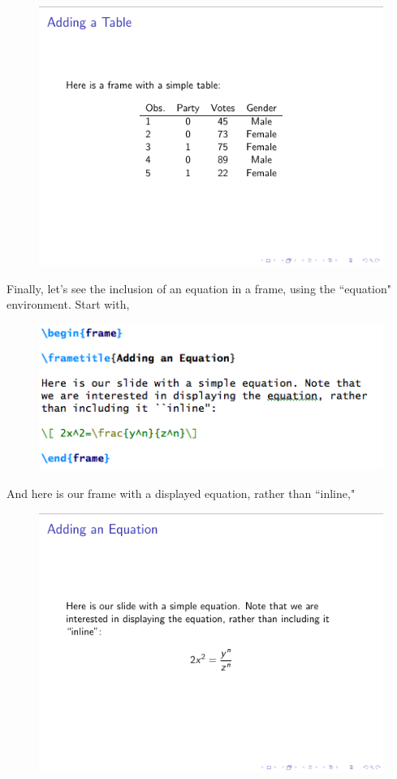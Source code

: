 \documentclass[11pt]{article}
\begin{document}
\begin{figure}[!h]
	\includegraphics[scale=.5]{OUT10}
	\centering
\end{figure}

Finally, let's see the inclusion of an equation in a frame, using the ``equation" environment. Start with,

\begin{figure}[!h]
	\includegraphics[scale=.6]{CODE11}
	\centering
\end{figure}

And here is our frame with a displayed equation, rather than ``inline,"

\begin{figure}[!h]
	\includegraphics[scale=.5]{OUT11}
	\centering
\end{figure}
\end{document}
